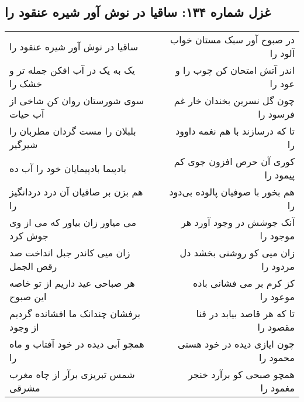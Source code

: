\begin{center}
\section*{غزل شماره ۱۳۴: ساقیا در نوش آور شیره عنقود را}
\label{sec:0134}
\begin{longtable}{l p{0.5cm} r}
ساقیا در نوش آور شیره عنقود را
&&
در صبوح آور سبک مستان خواب آلود را
\\
یک به یک در آب افکن جمله تر و خشک را
&&
اندر آتش امتحان کن چوب را و عود را
\\
سوی شورستان روان کن شاخی از آب حیات
&&
چون گل نسرین بخندان خار غم فرسود را
\\
بلبلان را مست گردان مطربان را شیرگیر
&&
تا که درسازند با هم نغمه داوود را
\\
بادپیما بادپیمایان خود را آب ده
&&
کوری آن حرص افزون جوی کم پیمود را
\\
هم بزن بر صافیان آن درد دردانگیز را
&&
هم بخور با صوفیان پالوده بی‌دود را
\\
می میاور زان بیاور که می از وی جوش کرد
&&
آنک جوشش در وجود آورد هر موجود را
\\
زان میی کاندر جبل انداخت صد رقص الجمل
&&
زان میی کو روشنی بخشد دل مردود را
\\
هر صباحی عید داریم از تو خاصه این صبوح
&&
کز کرم بر می فشانی باده موعود را
\\
برفشان چندانک ما افشانده گردیم از وجود
&&
تا که هر قاصد بیابد در فنا مقصود را
\\
همچو آبی دیده در خود آفتاب و ماه را
&&
چون ایازی دیده در خود هستی محمود را
\\
شمس تبریزی برآر از چاه مغرب مشرقی
&&
همچو صبحی کو برآرد خنجر مغمود را
\\
\end{longtable}
\end{center}
